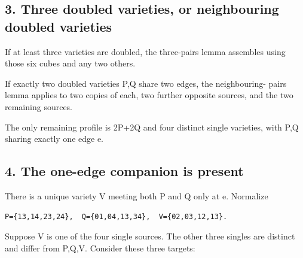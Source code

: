 \documentclass[
  10pt,
]{article}
\begin{document}
\hypertarget{three-doubled-varieties-or-neighbouring-doubled-varieties}{%
\subsection*{3. Three doubled varieties, or neighbouring doubled
varieties}\label{three-doubled-varieties-or-neighbouring-doubled-varieties}}

If at least three varieties are doubled, the three-pairs lemma assembles
using those six cubes and any two others.

If exactly two doubled varieties P,Q share two edges, the neighbouring-
pairs lemma applies to two copies of each, two further opposite sources,
and the two remaining sources.

The only remaining profile is 2P+2Q and four distinct single varieties,
with P,Q sharing exactly one edge e.

\hypertarget{the-one-edge-companion-is-present}{%
\subsection*{4. The one-edge companion is
present}\label{the-one-edge-companion-is-present}}

There is a unique variety V meeting both P and Q only at e. Normalize

\begin{verbatim}
P={13,14,23,24},  Q={01,04,13,34},  V={02,03,12,13}.
\end{verbatim}

Suppose V is one of the four single sources. The other three singles are
distinct and differ from P,Q,V. Consider these three targets:
\end{document}

